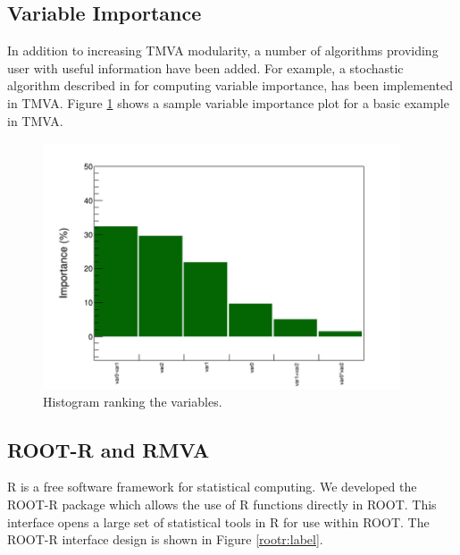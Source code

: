 \documentclass[a4paper]{jpconf}
\begin{document}
\subsection{Variable Importance}
In addition to increasing TMVA modularity, a number of algorithms providing user with useful information have been added. For example, a stochastic algorithm described in \cite{gleyzer2008paradigm} for computing variable importance, 
has been implemented in TMVA. Figure \ref{vi} shows a sample variable importance plot for a basic example in TMVA.

\clearpage
\begin{figure}[h]
\centering
\includegraphics[width=25pc]{img/vi.png}\caption{\label{vi} Histogram ranking the variables.}
\end{figure}


\subsection{ROOT-R and RMVA}\label{ROOTR}
R  is a free software framework for statistical computing\cite{R}. We developed the ROOT-R package which allows the  use of R functions directly in ROOT. This interface opens a large set of statistical tools in R for use within ROOT. The ROOT-R interface design is shown in Figure \ref{rootr:label}. 
\end{document}
